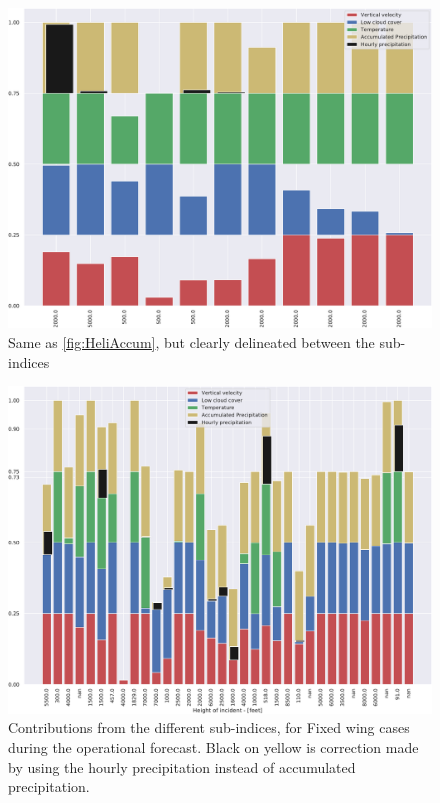 \begin{figure}[H]
    \centering
    \includegraphics[width=\textwidth]{Figures/HeliDecomp.pdf}
    \caption{Same as \ref{fig:HeliAccum}, but clearly delineated between the sub-indices}
    \label{fig:HeliDecomp}
\end{figure}

\begin{figure}[H]
    \centering
    \includegraphics[width=\textwidth]{Figures/FWAccum.pdf}
    \caption{Contributions from the different sub-indices, for Fixed wing cases during the operational forecast. Black on yellow is correction made by using the hourly precipitation instead of accumulated precipitation.}
    \label{fig:FWAccum}
\end{figure}

